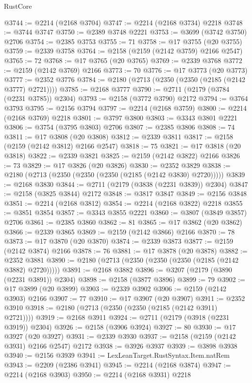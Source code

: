 \begin{lexlean}{RustCore}
\begin{coremodule}
@3744 := @2214 (@2168 @3704)
@3747 := @2214 (@2168 @3734) @2218
@3748 := @3744 @3747
@3750 := @2389 @3748 @2221
@3753 := @3699 (@3742 @3750) @2706
@3754 := @2385 @3753
@3755 := 71
@3758 := @17 @3755 (@20 @3755)
@3759 := @2339 @3758
@3764 := @2158 (@2159 (@2142 @3759) @2166 @2547)
@3765 := 72
@3768 := @17 @3765 (@20 @3765)
@3769 := @2339 @3768
@3772 := @2159 (@2142 @3769) @2166
@3773 := 70
@3776 := @17 @3773 (@20 @3773)
@3777 := @2352 @3776
@3784 := @2180 (@2713 (@2350 (@2350 (@2185 (@2142 @3777) @2721))))
@3785 := @2168 @3777
@3790 := @2711 (@2179 (@3784 (@2231 @3785)) @2304)
@3793 := @2158 (@3772 @3790) @2172
@3794 := @3764 @3793
@3795 := @2156 @3794
@3797 := @2214 (@2168 @3759)
@3800 := @2214 (@2168 @3769) @2218
@3801 := @3797 @3800
@3803 := @3343 @3801 @2221
@3806 := @3754 (@3795 @3803) @2706
@3807 := @2385 @3806
@3808 := 74
@3811 := @17 @3808 (@20 @3808)
@3812 := @2339 @3811
@3817 := @2158 (@2159 (@2142 @3812) @2166 @2547)
@3818 := 75
@3821 := @17 @3818 (@20 @3818)
@3822 := @2339 @3821
@3825 := @2159 (@2142 @3822) @2166
@3826 := 73
@3829 := @17 @3826 (@20 @3826)
@3830 := @2352 @3829
@3838 := @2180 (@2713 (@2350 (@2350 (@2350 (@2185 (@2142 @3830) @2720)))))
@3839 := @2168 @3830
@3844 := @2711 (@2179 (@3838 (@2231 @3839)) @2304)
@3847 := @2158 (@3825 @3844) @2172
@3848 := @3817 @3847
@3849 := @2156 @3848
@3851 := @2214 (@2168 @3812)
@3854 := @2214 (@2168 @3822) @2218
@3855 := @3851 @3854
@3857 := @3343 @3855 @2221
@3860 := @3807 (@3849 @3857) @2706
@3861 := @2385 @3860
@3862 := 81
@3865 := @17 @3862 (@20 @3862)
@3866 := @2339 @3865
@3869 := @2159 (@2142 @3866) @2166
@3870 := 78
@3873 := @17 @3870 (@20 @3870)
@3874 := @2339 @3873
@3877 := @2159 (@2142 @3874) @2166
@3878 := 76
@3881 := @17 @3878 (@20 @3878)
@3882 := @2352 @3881
@3890 := @2180 (@2713 (@2350 (@2350 (@2350 (@2185 (@2142 @3882) @2720)))))
@3891 := @2168 @3882
@3896 := @3207 (@2179 (@3890 (@2231 @3891)) @2304)
@3898 := @2158 (@3877 @3896)
@3899 := 79
@3902 := @17 @3899 (@20 @3899)
@3903 := @2339 @3902
@3906 := @2159 (@2142 @3903) @2166
@3907 := 77
@3910 := @17 @3907 (@20 @3907)
@3911 := @2352 @3910
@3918 := @2180 (@2713 (@2350 (@2350 (@2185 (@2142 @3911) @2721))))
@3919 := @2168 @3911
@3924 := @2711 (@2179 (@3918 (@2231 @3919)) @2304)
@3926 := @2158 (@3906 @3924)
@3927 := 80
@3930 := @17 @3927 (@20 @3927)
@3931 := @2339 @3930
@3937 := @2158 (@2159 (@2142 @3931) @2166 @2547) @2172
@3938 := @3926 @3937
@3939 := @3898 @3938
@3940 := @2156 @3939
@3941 := LexLeanTarget.RustSyntax.Item.natRem
@3943 := @2209 (@2386 @3941)
@3945 := @2214 (@2168 @3874)
@3947 := @2214 (@2168 @3903)
@3950 := @2214 (@2168 @3931) @2218

\end{coremodule}
\end{lexlean}
